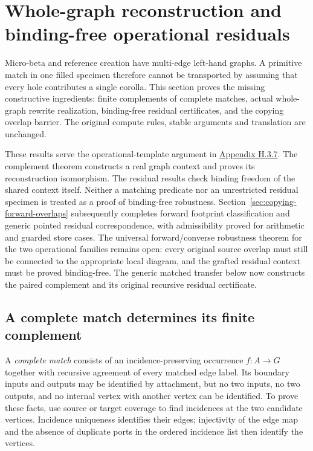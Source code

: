 \clearpage
\section{Whole-graph reconstruction and binding-free operational residuals}
\label{sec:copying-operational-transfer}
Micro-beta and reference creation have multi-edge left-hand graphs. A
primitive match in one filled specimen therefore cannot be transported by
assuming that every hole contributes a single corolla. This section proves
the missing constructive ingredients: finite complements of complete
matches, actual whole-graph rewrite realization, binding-free residual
certificates, and the copying overlap barrier. The original compute rules,
stable arguments and translation are unchanged.

These results serve the operational-template argument in
\href{https://arxiv.org/html/1907.01257v5\#A8.SS3.SSS7}{Appendix H.3.7}.
The complement theorem constructs a real graph context and proves its
reconstruction isomorphism. The residual results check binding freedom of
the shared context itself. Neither a matching predicate nor an unrestricted
residual specimen is treated as a proof of binding-free robustness.
Section~\ref{sec:copying-forward-overlaps} subsequently completes forward
footprint classification and generic pointed residual correspondence, with
admissibility proved for arithmetic and guarded store cases.
The universal forward/converse robustness theorem for the two operational
families remains open: every original source overlap must still be connected
to the appropriate local diagram, and the grafted residual context must
be proved binding-free. The generic matched transfer below now constructs
the paired complement and its original recursive residual certificate.

\subsection{A complete match determines its finite complement}
A \emph{complete match} consists of an incidence-preserving occurrence
$f:A\to G$ together with recursive agreement of every matched edge label.
Its boundary inputs and outputs may be identified by attachment, but no two
inputs, no two outputs, and no internal vertex with another vertex can be
identified. To prove these facts, use source or target coverage to find
incidences at the two candidate vertices. Incidence uniqueness identifies
their edges; injectivity of the edge map and the absence of duplicate ports
in the ordered incidence list then identify the vertices.

